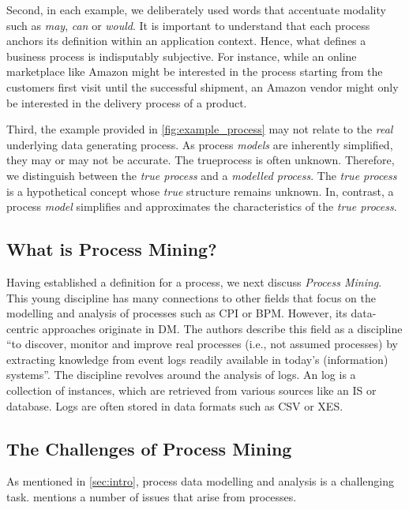 \documentclass[./../../paper.tex]{subfiles}
\begin{document}
Second, in each example, we deliberately used words that accentuate modality such as \emph{may}, \emph{can} or \emph{would}. It is important to understand that each process anchors its definition within an application context. Hence, what defines a business process is indisputably subjective. For instance, while an online marketplace like Amazon might be interested in the process starting from the customers first visit until the successful shipment, an Amazon vendor might only be interested in the delivery process of a product.

Third, the example provided in \autoref{fig:example_process} may not relate to the \emph{real} underlying data generating process. As process \emph{models} are inherently simplified, they may or may not be accurate. The \gls{trueprocess} is often unknown. Therefore, we distinguish between the \emph{true process} and a \emph{modelled process}. The \emph{true process} is a hypothetical concept whose \emph{true} structure remains unknown. In, contrast, a process \emph{model} simplifies and approximates the characteristics of the \emph{true process}.

\subsection{What is Process Mining?}
Having established a definition for a process, we next discuss \emph{Process Mining}. This young discipline has many connections to other fields that focus on the modelling and analysis of processes such as \gls{CPI} or \gls{BPM}\autocite{vanderaalst_ProcessMiningManifesto_2012}. However, its data-centric approaches originate in \gls{DM}.
The authors \citeauthor{vanderaalst_ProcessMiningManifesto_2012} describe this field as a discipline \enquote{to discover, monitor and improve real processes (i.e., not assumed processes) by extracting knowledge from event logs readily available in today's (information) systems}\autocite{vanderaalst_ProcessMiningManifesto_2012}. The discipline revolves around the analysis of \glspl{log}.
An \gls{log} is a collection of \glspl{instance}, which are retrieved from various sources like an \gls{IS} or database. Logs are often stored in data formats such as \gls{CSV} or \gls{XES}\autocite{vanderaalst_ProcessMiningManifesto_2012}.

\subsection{The Challenges of Process Mining}
As mentioned in \autoref{sec:intro}, process data modelling and analysis is a challenging task. \citeauthor{vanderaalst_ProcessMiningManifesto_2012} mentions a number of issues that arise from processes\autocite{vanderaalst_ProcessMiningManifesto_2012}.
\end{document}
